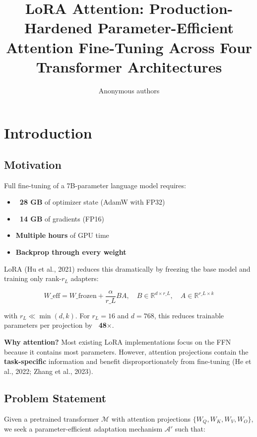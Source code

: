 \title{\textbf{LoRA Attention: Production-Hardened Parameter-Efficient Attention Fine-Tuning Across Four Transformer Architectures}}

\author{Anonymous authors}


\section{Introduction}

\subsection{Motivation}

Full fine-tuning of a 7B-parameter language model requires:
\begin{itemize}
\item \textbf{~28 GB} of optimizer state (AdamW with FP32)
\item \textbf{~14 GB} of gradients (FP16)
\item \textbf{Multiple hours} of GPU time
\item \textbf{Backprop through every weight}

\end{itemize}
LoRA (Hu et al., 2021) reduces this dramatically by freezing the base model 
and training only rank-$r_L$ adapters:

\[
W\_\text{eff} = W\_\text{frozen} + \frac{\alpha}{r\_L} B A, \quad
B \in \mathbb{R}^{d \times r\_L}, \quad A \in \mathbb{R}^{r\_L \times k}
\tag{1.1}
\]

with $r_L \ll \min(d, k)$. For $r_L = 16$ and $d = 768$, this reduces 
trainable parameters per projection by \textbf{~48$\times$}.

\textbf{Why attention?} Most existing LoRA implementations focus on the FFN 
because it contains most parameters. However, attention projections contain 
the \textbf{task-specific} information and benefit disproportionately from 
fine-tuning (He et al., 2022; Zhang et al., 2023).

\subsection{Problem Statement}

Given a pretrained transformer $\mathcal{M}$ with attention projections 
$\{W_Q, W_K, W_V, W_O\}$, we seek a parameter-efficient adaptation mechanism 
$\mathcal{A}'$ such that:


